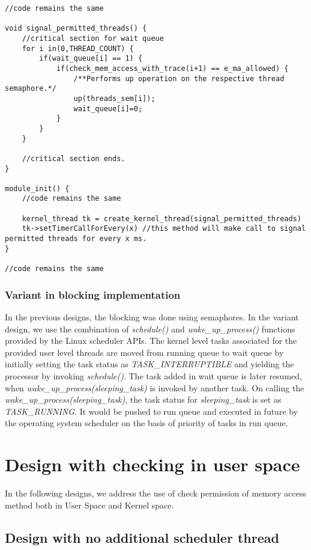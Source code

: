\documentclass[11pt]{article}
\begin{document}
\begin{lstlisting}[title=Kernel Space - General module definitions, style=customc]
//code remains the same

void signal_permitted_threads() {
	//critical section for wait queue
	for i in(0,THREAD_COUNT) {
		if(wait_queue[i] == 1) {
			if(check_mem_access_with_trace(i+1) == e_ma_allowed) {
				/**Performs up operation on the respective thread semaphore.*/
				up(threads_sem[i]);
				wait_queue[i]=0;			
			}		
		}
	}	
	
	//critical section ends.
}

module_init() {
	//code remains the same
	
	kernel_thread tk = create_kernel_thread(signal_permitted_threads)
	tk->setTimerCallForEvery(x) //this method will make call to signal permitted threads for every x ms.
}

//code remains the same
\end{lstlisting}

\subsubsection*{Variant in blocking implementation}

In the previous designs, the blocking was done using semaphores. 
In the variant design, we use the combination of \emph{schedule()} and \emph{wake\_up\_process()} functions provided by the Linux scheduler APIs. 
The kernel level tasks associated for the provided user level threads are moved from running queue to wait queue by initially setting the task status as \emph{TASK\_INTERRUPTIBLE} and yielding the processor by invoking \emph{schedule()}. 
The task added in wait queue is later resumed, when \emph{wake\_up\_process(sleeping\_task)} is invoked by another task. 
On calling the \emph{wake\_up\_process(sleeping\_task)}, the task status for \emph{sleeping\_task} is set as \emph{TASK\_RUNNING}. 
It would be pushed to run queue and executed in future by the operating system scheduler on the basis of priority of tasks in run queue. 
 

\section*{Design with checking in user space}

In the following designs, we address the use of check permission of memory access method both in User Space and Kernel space.

\subsection*{Design with no additional scheduler thread}
\end{document}
